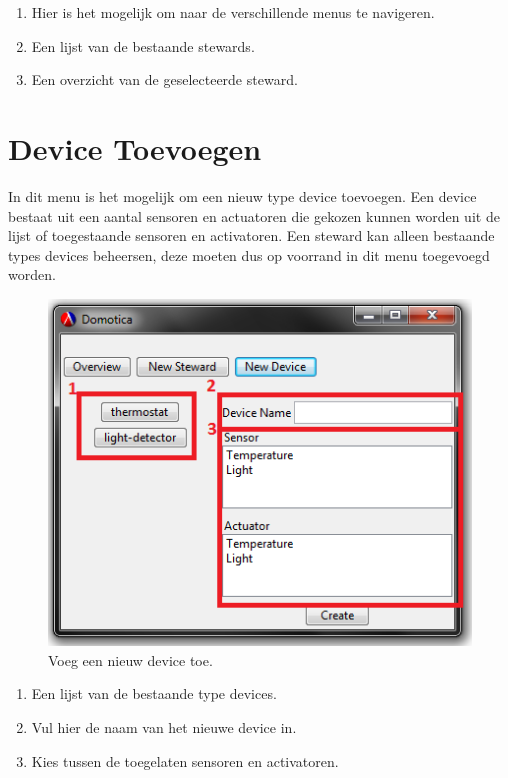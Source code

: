 \documentclass{article}
\begin{document}
	\begin{enumerate}
		\item Hier is het mogelijk om naar de verschillende menus te navigeren.
		\item Een lijst van de bestaande stewards.
		\item Een overzicht van de geselecteerde steward.
	\end{enumerate}
	
	\section{Device Toevoegen}
	\label{add-device}
	In dit menu is het mogelijk om een nieuw type device toevoegen. Een device bestaat uit een aantal sensoren en actuatoren die gekozen kunnen worden uit de lijst of toegestaande sensoren en activatoren. Een steward kan alleen bestaande types devices beheersen, deze moeten dus op voorrand in dit menu toegevoegd worden.
	
	\newpage
	\begin{figure}
		\begin{center}
			\includegraphics{screenshot/new-device.png}
		\end{center}
		\caption{Voeg een nieuw device toe.}
	\end{figure}
	
	\begin{enumerate}
		\item Een lijst van de bestaande type devices.
		\item Vul hier de naam van het nieuwe device in.
		\item Kies tussen de toegelaten sensoren en activatoren.
	\end{enumerate}
	
\end{document}

